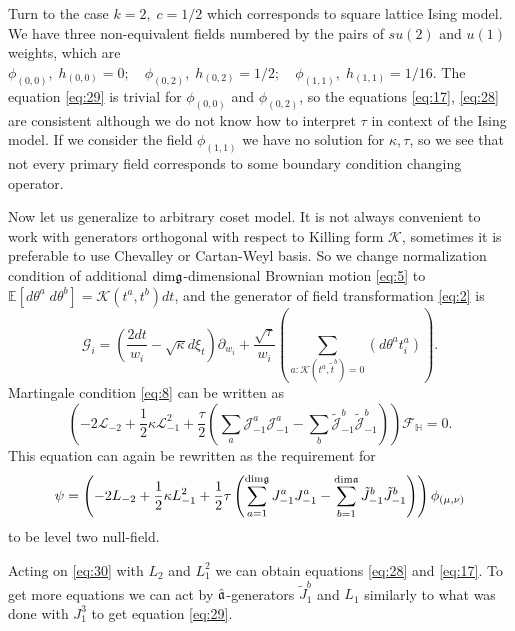 Turn to the case $k=2, \;c=1/2$ which corresponds to square lattice Ising model. We have three non-equivalent fields numbered by the pairs of $su(2)$ and $u(1)$ weights, which are $\phi_{(0,0)}, \; h_{(0,0)}=0; \quad \phi_{(0,2)}, \; h_{(0,2)}=1/2; \quad \phi_{(1,1)}, \; h_{(1,1)}=1/16$.
The equation \eqref{eq:29} is trivial for $\phi_{(0,0)}$ and $\phi_{(0,2)}$, so the equations \eqref{eq:17}, \eqref{eq:28} are consistent although we do not know how to interpret $\tau$ in context of the Ising model. If we consider the field $\phi_{(1,1)}$ we have no solution for $\kappa,\tau$, so we see that not every primary field corresponds to some boundary condition changing operator. 

Now let us generalize to arbitrary coset model. It is not always convenient to work with generators orthogonal with respect to Killing form $\mathcal{K}$, sometimes it is preferable to use Chevalley or Cartan-Weyl basis. So we change normalization condition of additional $\mathrm{dim}\mathfrak{g}$-dimensional Brownian motion \eqref{eq:5} to $\mathbb{E}\left[d\theta^{a}\; d\theta^{b}\right]=\mathcal{K}(t^{a},t^{b})dt$, and the generator of field transformation \eqref{eq:2} is
\begin{equation*}
  \mathcal{G}_{i}=\left(\frac{2dt}{w_{i}}-\sqrt{\kappa} d\xi_{t}\right) \partial_{w_{i}}+\frac{\sqrt{\tau}}{w_{i}}\left(\sum_{a:\mathcal{K}(t^{a},\tilde{t}^{b})=0}\left(d \theta ^{a} t^{a}_{i}\right)\right).
\end{equation*}
 Martingale condition  \eqref{eq:8} can be written as
\begin{equation*}
  \left(-2 \mathcal{L}_{-2}+\frac{1}{2}\kappa \mathcal{L}_{-1}^{2}+\frac{\tau}{2}\left( \sum_{a} \mathcal{J}^{a}_{-1} \mathcal{J}^{a}_{-1}-
      \sum_{b}\tilde{\mathcal{J}}^{b}_{-1} \tilde{\mathcal{J}}^{b}_{-1}\right)\right)        \mathcal{F}_{\mathbb{H}}=0.
\end{equation*}
This equation can again be rewritten as the requirement for
\begin{equation}
  \psi=\left(-2L_{-2}+\frac{1}{2}\kappa L_{-1}^{2}+\frac{1}{2}\tau \left(\sum_{a=1}^{\mathrm{dim}\mathfrak{g}}J^{a}_{-1}J^{a}_{-1}-\sum_{b=1}^{\mathrm{dim}\mathfrak{a}}\tilde{J}^{b}_{-1}\tilde{J}^{b}_{-1}\right)\right) \phi_{(\mu,\nu)}
\label{eq:30}
\end{equation}
to be level two null-field.

Acting on \eqref{eq:30} with $L_{2}$ and $L_{1}^{2}$ we can obtain equations \eqref{eq:28} and \eqref{eq:17}. To get more equations we can act by $\hat{\mathfrak{a}}$-generators $\tilde{J}^{b}_{1}$ and $L_{1}$ similarly to what was done with $J^{3}_{1}$ to get equation \eqref{eq:29}. 

